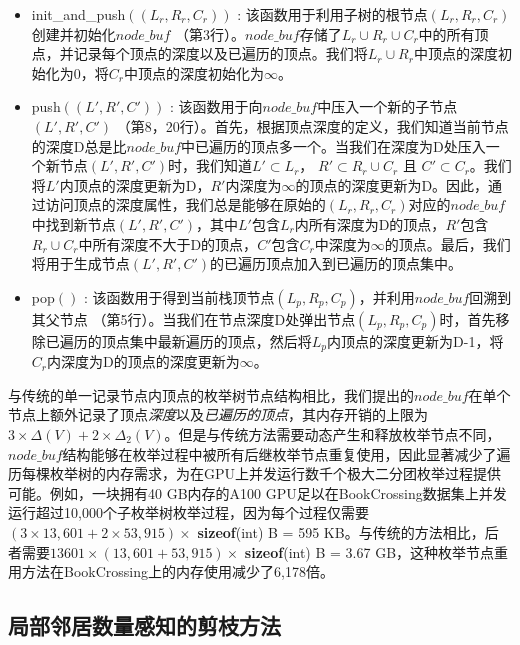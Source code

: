 \begin{itemize}
  \item  \textsf{init\_and\_push}$((L_r,R_r,C_r))$ : 该函数用于利用子树的根节点$(L_r,R_r,C_r)$创建并初始化$node\_buf$ （第3行）。$node\_buf$存储了$L_r \cup R_r \cup C_r$中的所有顶点，并记录每个顶点的深度以及已遍历的顶点。我们将$L_r \cup R_r$中顶点的深度初始化为0，将$C_r$中顶点的深度初始化为$\infty$。
  
  \item  \textsf{push}$((L',R',C'))$ : 该函数用于向$node\_buf$中压入一个新的子节点$(L',R',C')$ （第8，20行）。首先，根据顶点深度的定义，我们知道当前节点的深度D总是比$node\_buf$中已遍历的顶点多一个。当我们在深度为D处压入一个新节点$(L',R',C')$时，我们知道$L' \subset L_r$， $R' \subset R_r \cup C_r$ 且 $C' \subset C_r$。我们将$L'$内顶点的深度更新为D，$R'$内深度为$\infty$的顶点的深度更新为D。因此，通过访问顶点的深度属性，我们总是能够在原始的$(L_r,R_r,C_r)$对应的$node\_buf$中找到新节点$(L',R',C')$，其中$L'$包含$L_r$内所有深度为D的顶点，$R'$包含$R_r\cup C_r$中所有深度不大于D的顶点，$C'$包含$C_r$中深度为$\infty$的顶点。最后，我们将用于生成节点$(L',R',C')$的已遍历顶点加入到已遍历的顶点集中。

  \item  \textsf{pop}$()$ : 该函数用于得到当前栈顶节点$(L_p,R_p,C_p)$，并利用$node\_buf$回溯到其父节点 （第5行）。当我们在节点深度D处弹出节点$(L_p,R_p,C_p)$时，首先移除已遍历的顶点集中最新遍历的顶点，然后将$L_p$内顶点的深度更新为D-1，将$C_r$内深度为D的顶点的深度更新为$\infty$。
  
\end{itemize}




与传统的单一记录节点内顶点的枚举树节点结构相比，我们提出的$node\_buf$在单个节点上额外记录了顶点\textit{深度}以及\textit{已遍历的顶点}，其内存开销的上限为$3 \times \Delta(V) + 2 \times \Delta_2(V)$。但是与传统方法需要动态产生和释放枚举节点不同，$node\_buf$结构能够在枚举过程中被所有后继枚举节点重复使用，因此显著减少了遍历每棵枚举树的内存需求，为在GPU上并发运行数千个极大二分团枚举过程提供可能。例如，一块拥有40 GB内存的A100 GPU足以在BookCrossing数据集上并发运行超过10,000个子枚举树枚举过程，因为每个过程仅需要$(3 \times 13,601 + 2 \times 53,915) \times$ \textbf{sizeof}(int) B = 595 KB。与传统的方法相比，后者需要$13601 \times (13,601 + 53,915)\times$ \textbf{sizeof}(int) B = 3.67 GB，这种枚举节点重用方法在BookCrossing上的内存使用减少了6,178倍。

\subsection{局部邻居数量感知的剪枝方法}
\label{subsec:gmbe_prune}

